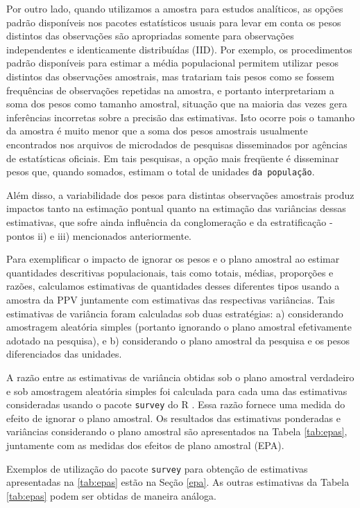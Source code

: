 \documentclass[]{book}
\theoremstyle{definition}
\theoremstyle{definition}
\theoremstyle{definition}
\theoremstyle{remark}
\begin{document}
Por outro lado, quando utilizamos a amostra para estudos analíticos, as
opções padrão disponíveis nos pacotes estatísticos usuais para levar em
conta os pesos distintos das observações são apropriadas somente para
observações independentes e identicamente distribuídas (IID). Por
exemplo, os procedimentos padrão disponíveis para estimar a média
populacional permitem utilizar pesos distintos das observações
amostrais, mas tratariam tais pesos como se fossem frequências de
observações repetidas na amostra, e portanto interpretariam a soma dos
pesos como tamanho amostral, situação que na maioria das vezes gera
inferências incorretas sobre a precisão das estimativas. Isto ocorre
pois o tamanho da amostra é muito menor que a soma dos pesos amostrais
usualmente encontrados nos arquivos de microdados de pesquisas
disseminados por agências de estatísticas oficiais. Em tais pesquisas, a
opção mais freqüente é disseminar pesos que, quando somados, estimam o
total de unidades \texttt{da\ população}.

Além disso, a variabilidade dos pesos para distintas observações
amostrais produz impactos tanto na estimação pontual quanto na estimação
das variâncias dessas estimativas, que sofre ainda influência da
conglomeração e da estratificação - pontos ii) e iii) mencionados
anteriormente.

Para exemplificar o impacto de ignorar os pesos e o plano amostral ao
estimar quantidades descritivas populacionais, tais como totais, médias,
proporções e razões, calculamos estimativas de quantidades desses
diferentes tipos usando a amostra da PPV juntamente com estimativas das
respectivas variâncias. Tais estimativas de variância foram calculadas
sob duas estratégias: a) considerando amostragem aleatória simples
(portanto ignorando o plano amostral efetivamente adotado na pesquisa),
e b) considerando o plano amostral da pesquisa e os pesos diferenciados
das unidades.

A razão entre as estimativas de variância obtidas sob o plano amostral
verdadeiro e sob amostragem aleatória simples foi calculada para cada
uma das estimativas consideradas usando o pacote \texttt{survey} do R
\citep{R-survey}. Essa razão fornece uma medida do efeito de ignorar o
plano amostral. Os resultados das estimativas ponderadas e variâncias
considerando o plano amostral são apresentados na Tabela \ref{tab:epas},
juntamente com as medidas dos efeitos de plano amostral (EPA).

Exemplos de utilização do pacote \texttt{survey} para obtenção de
estimativas apresentadas na \ref{tab:epas} estão na Seção \ref{epa}. As
outras estimativas da Tabela \ref{tab:epas} podem ser obtidas de maneira
análoga.
\end{document}
